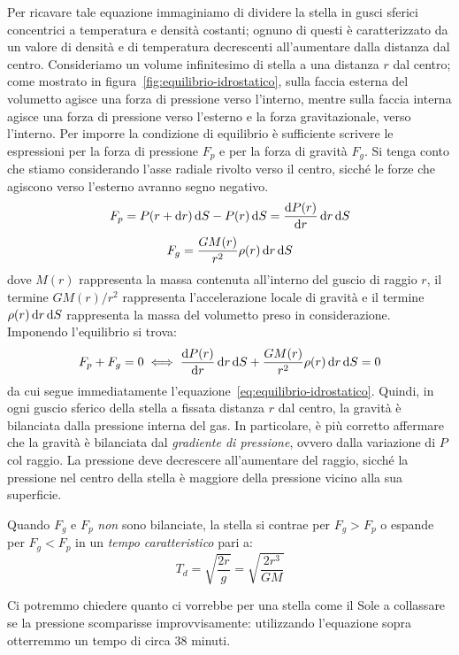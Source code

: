 Per ricavare tale equazione immaginiamo di dividere la stella in gusci sferici concentrici a temperatura e densità costanti; ognuno di questi è caratterizzato da un valore di densità e di temperatura decrescenti all'aumentare dalla distanza dal centro. Consideriamo un volume infinitesimo di stella a una distanza $r$ dal centro; come mostrato in figura~\ref{fig:equilibrio-idrostatico}, sulla faccia esterna del volumetto agisce una forza di pressione verso l'interno, mentre sulla faccia interna agisce una forza di pressione verso l'esterno e la forza gravitazionale, verso l'interno. Per imporre la condizione di equilibrio è sufficiente scrivere le espressioni per la forza di pressione $F_p$ e per la forza di gravità $F_g$. Si tenga conto che stiamo considerando l'asse radiale rivolto verso il centro, sicché le forze che agiscono verso l'esterno avranno segno negativo.
\[
    F_p = P(r+\mathop{\mathrm{{}d}}\mathopen{} r) \mathop{\mathrm{{}d}}\mathopen{} S - P(r) \mathop{\mathrm{{}d}}\mathopen{} S = \frac{\mathop{\mathrm{{}d}}\mathopen{} P(r)}{\mathop{\mathrm{{}d}}\mathopen{} r} \mathop{\mathrm{{}d}}\mathopen{} r \mathop{\mathrm{{}d}}\mathopen{} S
\]
\[
    F_g = \frac{GM(r)}{r^2} \rho(r) \mathop{\mathrm{{}d}}\mathopen{} r \mathop{\mathrm{{}d}}\mathopen{} S
\]
dove $M(r)$ rappresenta la massa contenuta all'interno del guscio di raggio $r$, il termine $GM(r) / r^2$ rappresenta l'accelerazione locale di gravità e il termine $\rho(r) \mathop{\mathrm{{}d}}\mathopen{} r \mathop{\mathrm{{}d}}\mathopen{} S$ rappresenta la massa del volumetto preso in considerazione. Imponendo l'equilibrio si trova:
\[
    F_p + F_g = 0 \iff \frac{\mathop{\mathrm{{}d}}\mathopen{} P(r)}{\mathop{\mathrm{{}d}}\mathopen{} r} \mathop{\mathrm{{}d}}\mathopen{} r \mathop{\mathrm{{}d}}\mathopen{} S+ \frac{GM(r)}{r^2} \rho(r) \mathop{\mathrm{{}d}}\mathopen{} r \mathop{\mathrm{{}d}}\mathopen{} S = 0
\]
da cui segue immediatamente l'equazione~\eqref{eq:equilibrio-idrostatico}. Quindi, in ogni guscio sferico della stella a fissata distanza $r$ dal centro, la gravità è bilanciata dalla pressione interna del gas. In particolare, è più corretto affermare che la gravità è bilanciata dal \emph{gradiente di pressione}, ovvero dalla variazione di $P$ col raggio. La pressione deve decrescere all'aumentare del raggio, sicché la pressione nel centro della stella è maggiore della pressione vicino alla sua superficie. 

Quando $F_g$ e $F_p$ \emph{non} sono bilanciate, la stella si contrae per $F_g > F_p$ o espande per $F_g < F_p$ in un \emph{tempo caratteristico} pari a:
\[
    T_d = \sqrt{\frac{2r}{g}} = \sqrt{\frac{2r^3}{GM}}
\]

Ci potremmo chiedere quanto ci vorrebbe per una stella come il Sole a collassare se la pressione scomparisse improvvisamente: utilizzando l'equazione sopra otterremmo un tempo di circa 38 minuti.